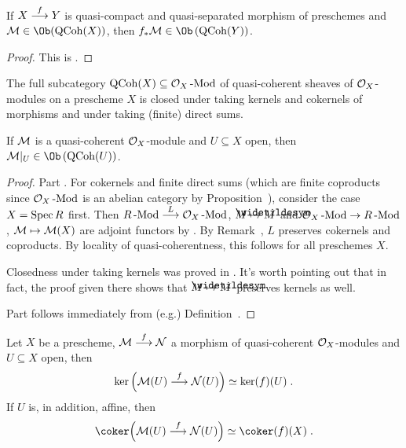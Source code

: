 \documentclass[a4paper,parskip=half,numbers=enddot, DIV=12]{scrreprt}
\begin{document}
\begin{prop}
	If $X\morphism[f]Y$ is quasi-compact and quasi-separated morphism of preschemes and $\Mm\in\Ob(\cat{QCoh}(X))$, then $f_*\Mm\in\Ob\left(\cat{QCoh}(Y)\right)$.
\end{prop}
\begin{proof}
	This is \cite[Proposition~1.5.2]{alggeo1}.
\end{proof}
\begin{prop}
	\begin{alphanumerate}
		\item {}The full subcategory $\operatorname{QCoh}(X)\subseteq\mathcal{O}_X\operatorname{-Mod}$ of quasi-coherent sheaves of $\mathcal{O}_X$-modules on a prescheme $X$ is closed under taking kernels and cokernels of morphisms and under taking (finite) direct sums.
		\item If $\mathcal{M}$ is a quasi-coherent $\mathcal{O}_X$-module and $U\subseteq X$ open, then $\Mm|_U\in\Ob\left(\cat{QCoh}(U)\right)$.
	\end{alphanumerate}
\end{prop}
\begin{proof}
	Part . For cokernels and finite direct sums (which are finite coproducts since $\mathcal{O}_X\operatorname{-Mod}$ is an abelian category by Proposition~), consider the case $X=\operatorname{Spec} R$ first. Then $R\cat{-Mod}\morphism[L]\Oo_X\cat{-Mod}$, $M\mapsto\snake{M}$ and $\Oo_X\cat{-Mod}\morphism R\cat{-Mod}$, $\mathcal{M}\mapsto\mathcal{M}(X)$ are adjoint functors by . By Remark~, $L$ preserves cokernels and coproducts. By locality of quasi-coherentness, this follows for all preschemes $X$.
	
	Closedness under taking kernels was proved in \cite[Fact~1.5.3]{alggeo1}. It's worth pointing out that in fact, the proof given there shows that $M\mapsto\snake{M}$ preserves kernels as well. 
	
	Part  follows immediately from (e.g.) Definition~.
\end{proof}
\begin{cor}
	Let $X$ be a prescheme, $\Mm\morphism[f]\Nn$ a morphism of quasi-coherent $\mathcal{O}_X$-modules and $U\subseteq X$ open, then
	\begin{align*}
		\ker\Big(\Mm(U)\morphism[f]\Nn(U)\Big)\simeq\ker(f)(U)\;.
	\end{align*}
	If $U$ is, in addition, affine, then
	\begin{align*}
		\coker\Big(\Mm(U)\morphism[f]\Nn(U)\Big)\simeq\coker(f)(X)\;.
	\end{align*}
\end{cor}
\end{document}
